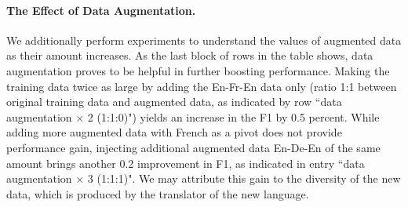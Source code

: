 \documentclass{article} \usepackage{iclr2018_conference,times}
\begin{document}
\paragraph{The Effect of Data Augmentation.}
We additionally perform experiments to understand the values of augmented data as their amount increases. As the last block of rows in the table shows, data augmentation proves to be helpful in further boosting performance. Making the training data twice as large by adding the En-Fr-En data only (ratio 1:1 between original training data and augmented data, as indicated by row ``data augmentation $\times$ 2 (1:1:0)") yields an increase in the F1 by 0.5 percent. 
While adding more augmented data with French as a pivot does not provide performance gain, injecting additional augmented data En-De-En of the same amount brings another 0.2 improvement in F1, as indicated in entry ``data augmentation $\times$ 3 (1:1:1)". We may attribute this gain to the diversity of the new data, which is produced by the translator of the new language.
\end{document}
